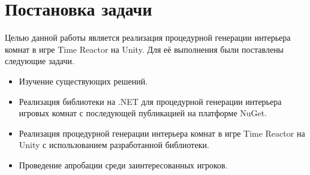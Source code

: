 
\section{Постановка задачи}

Целью данной работы является реализация процедурной генерации интерьера комнат в игре Time Reactor на Unity. Для её выполнения были поставлены следующие задачи.

\begin{itemize}
    \item Изучение существующих решений.
    \item Реализация библиотеки на .NET для процедурной генерации интерьера игровых комнат с последующей публикацией на платформе NuGet.
    \item Реализация процедурной генерации интерьера комнат в игре Time
    Reactor на Unity с использованием разработанной библиотеки.
    \item Проведение апробации среди заинтересованных игроков.
\end{itemize}